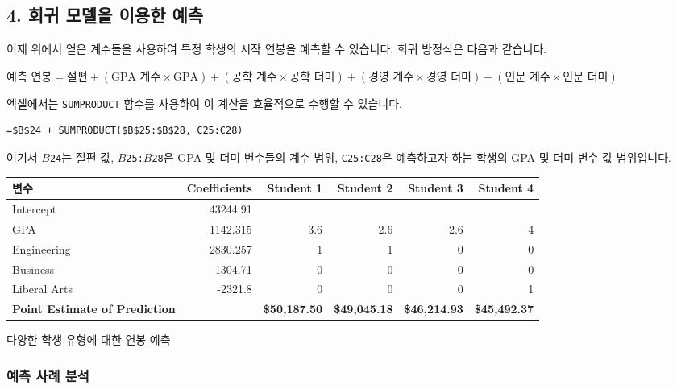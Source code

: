 \documentclass[11pt,a4paper]{book}
\theoremstyle{definition}
\begin{document}
\subsection{4. 회귀 모델을 이용한 예측}

이제 위에서 얻은 계수들을 사용하여 특정 학생의 시작 연봉을 예측할 수 있습니다. 회귀 방정식은 다음과 같습니다.

$\text{예측 연봉} = \text{절편} + (\text{GPA 계수} \times \text{GPA}) + (\text{공학 계수} \times \text{공학 더미}) + (\text{경영 계수} \times \text{경영 더미}) + (\text{인문 계수} \times \text{인문 더미})$

엑셀에서는 \texttt{SUMPRODUCT} 함수를 사용하여 이 계산을 효율적으로 수행할 수 있습니다.

\begin{lstlisting}[caption={엑셀 SUMPRODUCT 함수를 이용한 예측 공식}, label={lst:sumproduct_formula}]
=$B$24 + SUMPRODUCT($B$25:$B$28, C25:C28)
\end{lstlisting}
여기서 \texttt{$B$24}는 절편 값, \texttt{$B$25:$B$28}은 GPA 및 더미 변수들의 계수 범위, \texttt{C25:C28}은 예측하고자 하는 학생의 GPA 및 더미 변수 값 범위입니다.

\begin{adjustbox}{width=\textwidth,center}
\begin{tabular}{lrrrrr}
\toprule
\textbf{변수} & \textbf{Coefficients} & \textbf{Student 1} & \textbf{Student 2} & \textbf{Student 3} & \textbf{Student 4} \\
\midrule
Intercept & 43244.91 & & & & \\
GPA & 1142.315 & 3.6 & 2.6 & 2.6 & 4 \\
Engineering & 2830.257 & 1 & 1 & 0 & 0 \\
Business & 1304.71 & 0 & 0 & 0 & 0 \\
Liberal Arts & -2321.8 & 0 & 0 & 0 & 1 \\
\midrule
\textbf{Point Estimate of Prediction} & & \textbf{\$50,187.50} & \textbf{\$49,045.18} & \textbf{\$46,214.93} & \textbf{\$45,492.37} \\
\bottomrule
\end{tabular}
\caption{다양한 학생 유형에 대한 연봉 예측}
\label{tab:prediction_examples}
\end{adjustbox}

\subsubsection*{예측 사례 분석}
\end{document}
